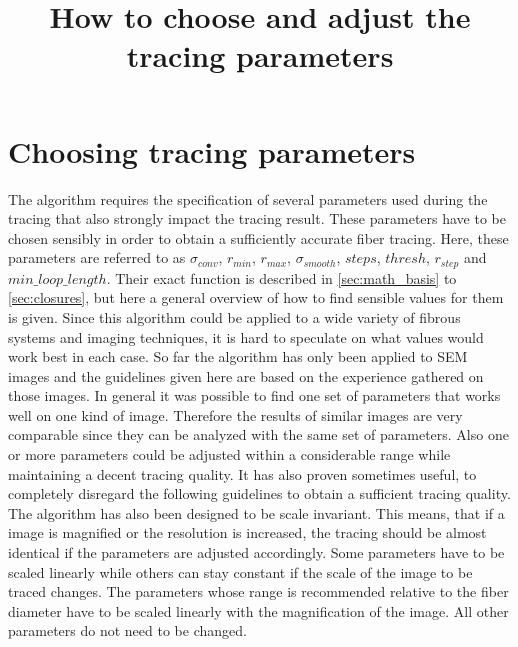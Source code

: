 \documentclass[12pt,english,twocolumn]{revtex4}
\begin{document}
\title{How to choose and adjust the tracing parameters}

\maketitle
\makeatletter\onecolumngrid@push\makeatother

\tableofcontents
\newpage

\makeatletter\onecolumngrid@pop\makeatother
\newpage
\clearpage
\section{Choosing tracing parameters} \label{sec:input_params}
The algorithm requires the specification of several parameters used during the tracing that also strongly impact the tracing result. These parameters have to be chosen sensibly in order to obtain a sufficiently accurate fiber tracing. Here, these parameters are referred to as $\sigma_{conv}$, $r_{min}$, $r_{max}$, $\sigma_{smooth}$, $steps$, $thresh$, $r_{step}$ and $min\_loop\_length$. Their exact function is described in \ref{sec:math_basis} to \ref{sec:closures}, but here a general overview of how to find sensible values for them is given. Since this algorithm could be applied to a wide variety of fibrous systems and imaging techniques, it is hard to speculate on what values would work best in each case. So far the algorithm has only been applied to SEM images and the guidelines given here are based on the experience gathered on those images. In general it was possible to find one set of parameters that works well on one kind of image. Therefore the results of similar images are very comparable since they can be analyzed with the same set of parameters. Also one or more parameters could be adjusted within a considerable range while maintaining a decent tracing quality. It has also proven sometimes useful, to completely disregard the following guidelines to obtain a sufficient tracing quality. The algorithm has also been designed to be scale invariant. This means, that if a image is magnified or the resolution is increased, the tracing should be almost identical if the parameters are adjusted accordingly. Some parameters have to be scaled linearly while others can stay constant if the scale of the image to be traced changes. The parameters whose range is recommended relative to the fiber diameter have to be scaled linearly with the magnification of the image. All other parameters do not need to be changed.\\
\end{document}
